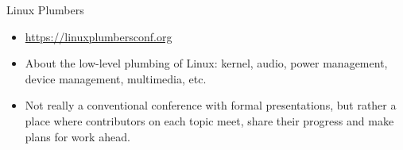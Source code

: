 \item Linux Plumbers
  \begin{itemize}
  \item \url{https://linuxplumbersconf.org}
  \item About the low-level plumbing of Linux: kernel, audio, power
    management, device management, multimedia, etc.
  \item Not really a conventional conference with formal
    presentations, but rather a place where contributors on each topic
    meet, share their progress and make plans for work ahead.
  \end{itemize}
